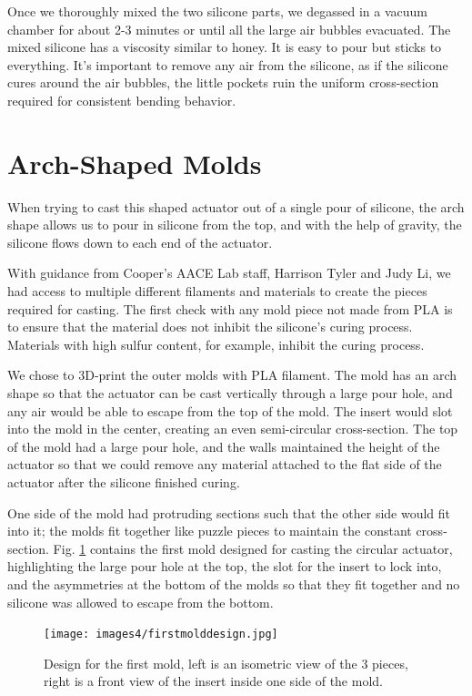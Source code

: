 Once we thoroughly mixed the two silicone parts, we degassed in a vacuum chamber for about 2-3 minutes or until all the large air bubbles evacuated. The mixed silicone has a viscosity similar to honey. It is easy to pour but sticks to everything. It's important to remove any air from the silicone, as if the silicone cures around the air bubbles, the little pockets ruin the uniform cross-section required for consistent bending behavior. 

\clearpage
\section{Arch-Shaped Molds}
When trying to cast this shaped actuator out of a single pour of silicone, the arch shape allows us to pour in silicone from the top, and with the help of gravity, the silicone flows down to each end of the actuator. 

With guidance from Cooper's AACE Lab staff, Harrison Tyler and Judy Li, we had access to multiple different filaments and materials to create the pieces required for casting. The first check with any mold piece not made from PLA is to ensure that the material does not inhibit the silicone's curing process. Materials with high sulfur content, for example, inhibit the curing process. 

We chose to 3D-print the outer molds with PLA filament. The mold has an arch shape so that the actuator can be cast vertically through a large pour hole, and any air would be able to escape from the top of the mold. The insert would slot into the mold in the center, creating an even semi-circular cross-section. The top of the mold had a large pour hole, and the walls maintained the height of the actuator so that we could remove any material attached to the flat side of the actuator after the silicone finished curing. 

One side of the mold had protruding sections such that the other side would fit into it; the molds fit together like puzzle pieces to maintain the constant cross-section. Fig. \ref{fig:firstmold} contains the first mold designed for casting the circular actuator, highlighting the large pour hole at the top, the slot for the insert to lock into, and the asymmetries at the bottom of the molds so that they fit together and no silicone was allowed to escape from the bottom. 

\begin{figure}[ht]
    \centering
    \texttt{[image: images4/firstmolddesign.jpg]}
    \caption{Design for the first mold, left is an isometric view of the 3 pieces, right is a front view of the insert inside one side of the mold.}
    \label{fig:firstmold}
\end{figure}

